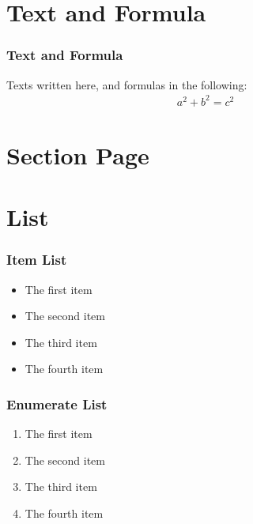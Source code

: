 \section{Text and Formula}
\begin{frame}
  \frametitle{Text and Formula}
  Texts written here, and formulas in the following:
  \begin{align*}
    a^2+b^2 = c^2
  \end{align*}  
\end{frame}
\section{Section Page}
\begin{frame}
\sectionpage
\end{frame}
\section{List}
\begin{frame}
  \frametitle{Item List}
  \begin{itemize}
  \item The first item
  \item The second item
  \item The third item
  \item The fourth item
  \end{itemize}
\end{frame}

\begin{frame}
  \frametitle{Enumerate List}
  \begin{enumerate}
    \item The first item
    \item The second item
    \item The third item
    \item The fourth item
    \end{enumerate}
\end{frame}
